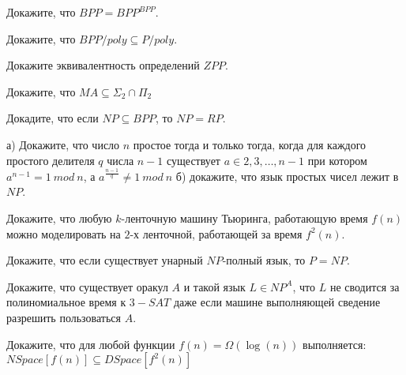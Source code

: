 \setcounter{curtask}{23}


\begin{task}
    Докажите, что $BPP = BPP^{BPP}$.
\end{task}

\begin{task}
    Докажите, что $BPP/poly \subseteq P/poly$.
\end{task}

\begin{task}
    Докажите эквивалентность определений $ZPP$.
\end{task}

\begin{task}
    Докажите, что $MA \subseteq \Sigma_2 \cap \Pi_2$
\end{task}

\begin{task}
    Докадите, что если $NP \subseteq BPP$, то $NP = RP$.
\end{task}

\breakline

\begin{ptask}{4}
    а) Докажите, что число $n$ простое тогда и только тогда, когда для каждого
    простого делителя $q$ числа $n - 1$ существует $a \in {2, 3, \dots, n - 1}$ при котором
    $a^{n - 1} = 1~mod~n$, а $a^{\frac{n - 1}{q}} \ne 1~mod~n$
    б) докажите, что язык простых чисел лежит в $NP$.
\end{ptask}

\begin{ptask}{8}
    Докажите, что любую $k$-ленточную машину Тьюринга, работающую время $f(n)$ можно
    моделировать на $2$-х ленточной, работающей за время $f^2(n)$.
\end{ptask}


\begin{ptask}{12}
	Докажите, что если существует унарный $NP$-полный язык, то $P = NP$.
\end{ptask}

\begin{ptask}{13}
    Докажите, что существует оракул $A$ и такой язык $L \in NP^A$, что $L$ не
    сводится за полиномиальное время к $3-SAT$ даже если машине выполняющей сведение
    разрешить пользоваться $A$.
\end{ptask}

\begin{ptask}{17}
    Докажите, что для любой функции $f(n) = \Omega(\log(n))$ выполняется:
    $NSpace[f(n)] \subseteq DSpace[f^2(n)]$
\end{ptask}

